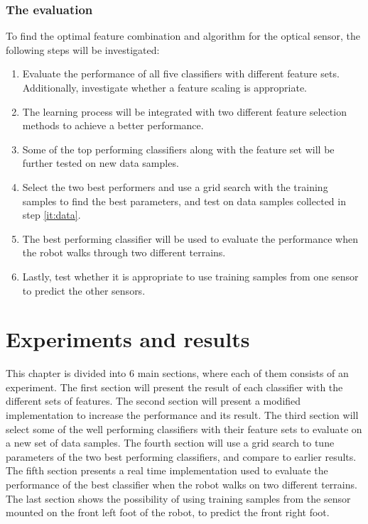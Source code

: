 \documentclass[USenglish]{ifimaster}  %
\begin{document}
\clearpage
\subsection{The evaluation}
To find the optimal feature combination and algorithm for the optical sensor, the following steps will be investigated:

\begin{enumerate}
	\item Evaluate the performance of all five classifiers with different feature sets. Additionally, investigate whether a feature scaling is appropriate.  
	\item The learning process will be integrated with two different feature selection methods to achieve a better performance. 
	\item \label{it:data} Some of the top performing classifiers along with the feature set will be further tested on new data samples.
	\item Select the two best performers and use a grid search with the training samples to find the best parameters, and test on data samples collected in step \ref{it:data}.
	\item The best performing classifier will be used to evaluate the performance when the robot walks through two different terrains.
	\item Lastly, test whether it is appropriate to use training samples from one sensor to predict the other sensors. 
\end{enumerate}


\chapter{Experiments and results}                     %
This chapter is divided into 6 main sections, where each of them consists of an experiment. The first section will present the result of each classifier with the different sets of features. The second section will present a modified implementation to increase the performance and its result. The third section will select some of the well performing classifiers with their feature sets to evaluate on a new set of data samples. The fourth section will use a grid search to tune parameters of the two best performing classifiers, and compare to earlier results. The fifth section presents a real time implementation used to evaluate the performance of the best classifier when the robot walks on two different terrains. The last section shows the possibility of using training samples from the sensor mounted on the front left foot of the robot, to predict the front right foot.
 
\end{document}
